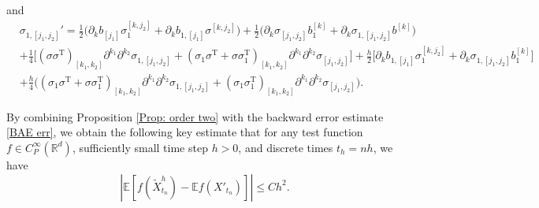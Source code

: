 \documentclass[12pt,a4paper,reqno]{amsart}
\numberwithin{equation}{section}
\begin{document}
and 
\begin{equation*}
    \begin{aligned}
&\sigma_{1,[j_1,j_2]}' = \frac{1}{2} \Big( \partial_k b_{[j_1]}\sigma_1^{[k,j_2]} + \partial_k b_{1,[j_1]}\sigma^{[k,j_2]} \Big)
+\frac{1}{2} \Big( \partial_k \sigma_{[j_1,j_2]} b_1^{[k]} + \partial_k \sigma_{1,[j_1,j_2]} b^{[k]} \Big)\\
&+\frac{1}{4}  \Big[ (\sigma \sigma^{\mathrm{T}})_{[k_1,k_2]} \partial^{k_1}\partial^{k_2} \sigma_{1,[j_1,j_2]}+
(\sigma_1 \sigma^{\mathrm{T}} + \sigma \sigma_1^{\mathrm{T}})_{[k_1,k_2]} \partial^{k_1}\partial^{k_2} \sigma_{[j_1,j_2]} \Big]+\frac{h}{2} \Big[ \partial_k b_{1,[j_1]} \sigma_1^{[k,j_2]} + \partial_k \sigma_{1,[j_1,j_2]} b_1^{[k]} \Big]\\
&+ \frac{h}{4} \Big( (\sigma_1 \sigma^{\mathrm{T}} + \sigma \sigma_1^{\mathrm{T}})_{[k_1,k_2]} \partial^{k_1} \partial^{k_2} \sigma_{1,[j_1,j_2]} + (\sigma_1 \sigma_1^{\mathrm{T}})_{[k_1,k_2]} \partial^{k_1} \partial^{k_2} \sigma_{[j_1,j_2]} \Big). 
\end{aligned}
\end{equation*}

By combining Proposition \ref{Prop: order two} with the backward error estimate \eqref{BAE err}, we obtain the following key estimate that for any test function $f\in C_P^{\infty}(\mathbb{R}^d)$, sufficiently small time step $h>0$, and discrete times $t_h = nh$, we have
    \begin{equation}\label{X'_t X_t err}
         \left|\mathbb{E}[f(\tilde{X}^h_{t_n}) - \mathbb{E}f(X'_{t_n})]\right| \leq C h^2.
    \end{equation}
 
\end{document}
